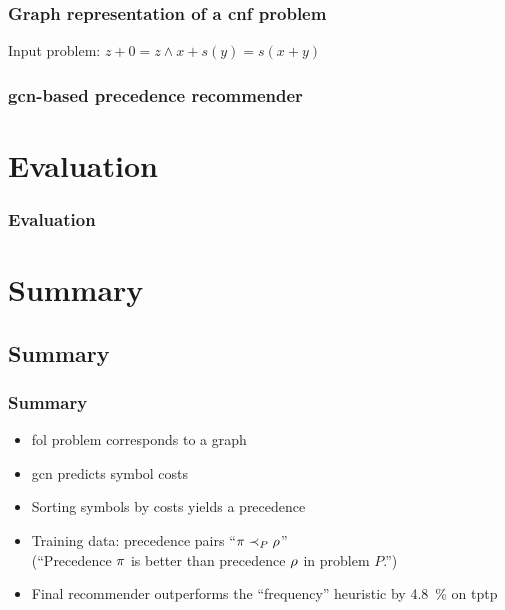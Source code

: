\documentclass[a4paper]{beamer}
\begin{document}
\begin{frame}
\frametitle{Graph representation of a \acrshort{cnf} problem}

Input problem: $z + 0 = z \land x + s(y) = s(x + y)$

\centering

\end{frame}

\begin{frame}
\frametitle{\Acrshort{gcn}-based precedence recommender}
\centering

\end{frame}

\section{Evaluation}

\begin{frame}
\frametitle{Evaluation}

\fontsize{10pt}{12}\selectfont

\centering


\end{frame}

\section{Summary}
\subsection*{Summary}
\begin{frame}
\frametitle{Summary}
\begin{itemize}
\item \Acrfull{fol} problem corresponds to a graph
\item \Acrfull{gcn} predicts symbol costs
\item Sorting symbols by costs yields a precedence
\item Training data: precedence pairs ``$\pi \prec_{P} \rho$'' \\
(``Precedence $\pi$ is better than precedence $\rho$ in problem $P$.'')
\item Final recommender outperforms the ``frequency'' heuristic by \SI{4.8}{\percent} on \acrshort{tptp}
\end{itemize}
\end{frame}
\end{document}
